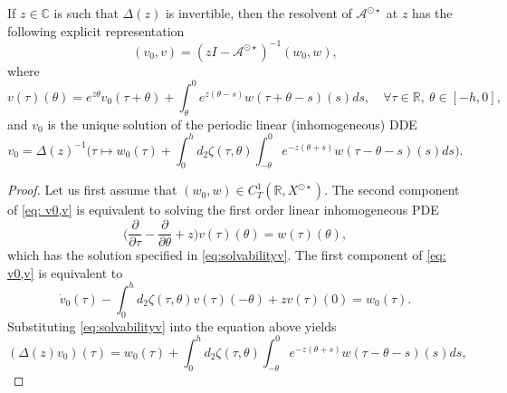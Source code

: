 \documentclass[english]{myarticle}
\begin{document}
\begin{sloppypar}
\begin{proposition} \label{prop:solvability}
If $z \in \mathbb{C}$ is such that $\Delta(z)$ is invertible, then the resolvent of $\mathcal{A}^{\odot \star}$ at $z$ has the following explicit representation
\begin{equation} \label{eq: v0,v}
    (v_0,v) = (zI - \mathcal{A}^{\odot \star})^{-1} (w_0,w),
\end{equation}
where
\begin{equation} \label{eq:solvabilityv}
    v(\tau)(\theta) = e^{z \theta} v_0(\tau + \theta) + \int_\theta^0 e^{z(\theta -s)} w(\tau + \theta - s)(s) ds, \quad \forall \tau \in \mathbb{R}, \ \theta \in [-h,0],
\end{equation}
and $v_0$ is the unique solution of the periodic linear (inhomogeneous) DDE
\begin{equation} \label{eq:solvabilityu}
    v_0 = \Delta(z)^{-1}\bigg( \tau \mapsto w_0(\tau) + \int_0^h d_2 \zeta(\tau,\theta)\int_{-\theta}^{0} e^{-z(\theta + s)} w(\tau -\theta - s)(s) ds \bigg).
\end{equation}
\begin{proof}
Let us first assume that $(w_0,w) \in C_T^1(\mathbb{R},X^{\odot \star})$. The second component of \eqref{eq: v0,v} is equivalent to solving the first order linear inhomogeneous PDE
\begin{equation*}
\bigg( \frac{\partial}{\partial \tau} - \frac{\partial}{\partial \theta} +z \bigg) v(\tau)(\theta) = w(\tau)(\theta),    
\end{equation*}
which has the solution specified in \eqref{eq:solvabilityv}. The first component of \eqref{eq: v0,v} is equivalent to
\begin{equation*}
    \dot{v}_0(\tau) - \int_{0}^h d_2 \zeta (\tau,\theta)v(\tau)(-\theta) + zv(\tau)(0) = w_0(\tau).
\end{equation*}
Substituting \eqref{eq:solvabilityv} into the equation above yields
\begin{equation} \label{eq:Deltazv0}
    (\Delta(z)v_0)(\tau) = w_0(\tau) + \int_0^h d_2 \zeta(\tau,\theta)\int_{-\theta}^{0} e^{-z(\theta + s)} w(\tau -\theta - s)(s) ds,
\end{equation}

\end{proof}
\end{proposition}
\end{sloppypar}
\end{document}
